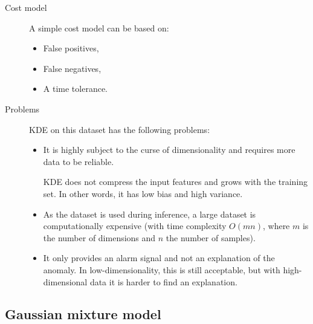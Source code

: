 \begin{description}
    \item[Cost model]
        A simple cost model can be based on:
        \begin{itemize}
            \item False positives,
            \item False negatives,
            \item A time tolerance.
        \end{itemize}

    \item[Problems]
        KDE on this dataset has the following problems:
        \begin{itemize}
            \item It is highly subject to the curse of dimensionality and requires more data to be reliable.
            \begin{remark}
                KDE does not compress the input features and grows with the training set. In other words, it has low bias and high variance.
            \end{remark}

            \item As the dataset is used during inference, a large dataset is computationally expensive (with time complexity $O(mn)$, where $m$ is the number of dimensions and $n$ the number of samples).

            \item It only provides an alarm signal and not an explanation of the anomaly. In low-dimensionality, this is still acceptable, but with high-dimensional data it is harder to find an explanation.
        \end{itemize}
\end{description}


\subsection{Gaussian mixture model}


